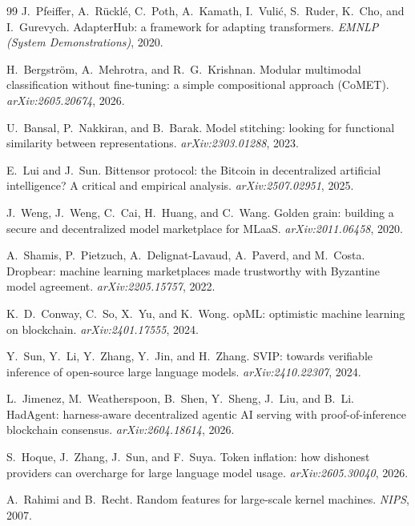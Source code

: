 \documentclass[11pt]{article}
\begin{document}
\begin{thebibliography}{99}
    J.~Pfeiffer, A.~R\"uckl\'e, C.~Poth, A.~Kamath, I.~Vuli\'c,
    S.~Ruder, K.~Cho, and I.~Gurevych.
    AdapterHub: a framework for adapting transformers.
    \emph{EMNLP (System Demonstrations)}, 2020.

    H.~Bergstr\"om, A.~Mehrotra, and R.~G.~Krishnan.
    Modular multimodal classification without fine-tuning: a simple
    compositional approach (CoMET).
    \emph{arXiv:2605.20674}, 2026.

    U.~Bansal, P.~Nakkiran, and B.~Barak.
    Model stitching: looking for functional similarity between
    representations.
    \emph{arXiv:2303.01288}, 2023.

    E.~Lui and J.~Sun.
    Bittensor protocol: the Bitcoin in decentralized artificial
    intelligence? A critical and empirical analysis.
    \emph{arXiv:2507.02951}, 2025.

    J.~Weng, J.~Weng, C.~Cai, H.~Huang, and C.~Wang.
    Golden grain: building a secure and decentralized model marketplace
    for MLaaS.
    \emph{arXiv:2011.06458}, 2020.

    A.~Shamis, P.~Pietzuch, A.~Delignat-Lavaud, A.~Paverd, and
    M.~Costa.
    Dropbear: machine learning marketplaces made trustworthy with
    Byzantine model agreement.
    \emph{arXiv:2205.15757}, 2022.

    K.~D.~Conway, C.~So, X.~Yu, and K.~Wong.
    opML: optimistic machine learning on blockchain.
    \emph{arXiv:2401.17555}, 2024.

    Y.~Sun, Y.~Li, Y.~Zhang, Y.~Jin, and H.~Zhang.
    SVIP: towards verifiable inference of open-source large language
    models.
    \emph{arXiv:2410.22307}, 2024.

    L.~Jimenez, M.~Weatherspoon, B.~Shen, Y.~Sheng, J.~Liu, and
    B.~Li.
    HadAgent: harness-aware decentralized agentic AI serving with
    proof-of-inference blockchain consensus.
    \emph{arXiv:2604.18614}, 2026.

    S.~Hoque, J.~Zhang, J.~Sun, and F.~Suya.
    Token inflation: how dishonest providers can overcharge for large
    language model usage.
    \emph{arXiv:2605.30040}, 2026.

    A.~Rahimi and B.~Recht.
    Random features for large-scale kernel machines.
    \emph{NIPS}, 2007.


\end{thebibliography}
\end{document}
